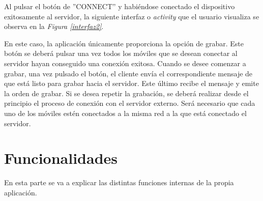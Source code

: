 \documentclass[a4paper,11pt]{book}
\begin{document}
	
	Al pulsar el botón de ''CONNECT'' y habiéndose conectado el dispositivo exitosamente al servidor, la siguiente interfaz o \textit{activity} que el usuario visualiza se observa en la \textit{Figura \ref{interfaz2}}.
	
	En este caso, la aplicación únicamente proporciona la opción de grabar. Este botón se deberá pulsar una vez todos los móviles que se desean conectar al servidor hayan conseguido una conexión exitosa. Cuando se desee comenzar a grabar, una vez pulsado el botón, el cliente envía el correspondiente mensaje de que está listo para grabar hacia el servidor. Este último recibe el mensaje y emite la orden de grabar. Si se desea repetir la grabación, se deberá realizar desde el principio el proceso de conexión con el servidor externo. Será necesario que cada uno de los móviles estén conectados a la misma red a la que está conectado el servidor.

	\section{Funcionalidades}
	En esta parte se va a explicar las distintas funciones internas de la propia aplicación.
	
\end{document}
